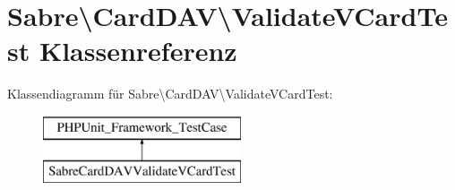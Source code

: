 \hypertarget{class_sabre_1_1_card_d_a_v_1_1_validate_v_card_test}{}\section{Sabre\textbackslash{}Card\+D\+AV\textbackslash{}Validate\+V\+Card\+Test Klassenreferenz}
\label{class_sabre_1_1_card_d_a_v_1_1_validate_v_card_test}
Klassendiagramm für Sabre\textbackslash{}Card\+D\+AV\textbackslash{}Validate\+V\+Card\+Test\+:\begin{figure}[H]
\begin{center}
\leavevmode
\includegraphics[height=2.000000cm]{class_sabre_1_1_card_d_a_v_1_1_validate_v_card_test}
\end{center}
\end{figure}
